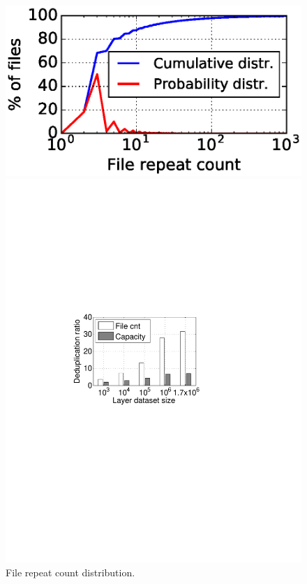 
\begin{figure}[t]
	\centering
	\begin{minipage}{0.273\textwidth}
		\centering
		\includegraphics[width=1\textwidth]{graphs/File_repeat_count.eps}
		\caption{File repeat count distribution.
		}
		\label{fig:file-repeat-cnt}
	\end{minipage}
	\begin{minipage}{0.2\textwidth}
		\centering
		\includegraphics[width=1\textwidth]{graphs/dedup-ratio-grow} 

\end{minipage}
\end{figure}
